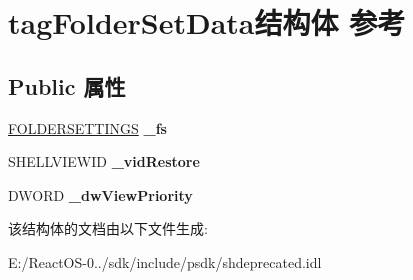 \hypertarget{structtag_folder_set_data}{}\section{tag\+Folder\+Set\+Data结构体 参考}
\label{structtag_folder_set_data}
\subsection*{Public 属性}
\begin{DoxyCompactItemize}
\item 
\mbox{\label{structtag_folder_set_data_a46dbc18628160badaa4b10a3410b9991}} 
\hyperlink{struct_f_o_l_d_e_r_s_e_t_t_i_n_g_s}{F\+O\+L\+D\+E\+R\+S\+E\+T\+T\+I\+N\+GS} {\bfseries \+\_\+fs}
\item 
\mbox{\label{structtag_folder_set_data_a32a71ecb055dd6701be303ba2a637d75}} 
S\+H\+E\+L\+L\+V\+I\+E\+W\+ID {\bfseries \+\_\+vid\+Restore}
\item 
\mbox{\label{structtag_folder_set_data_ad52b46d5c1b82e7120fce8ed0dea4ae1}} 
D\+W\+O\+RD {\bfseries \+\_\+dw\+View\+Priority}
\end{DoxyCompactItemize}


该结构体的文档由以下文件生成\+:\begin{DoxyCompactItemize}
\item 
E\+:/\+React\+O\+S-\/0../sdk/include/psdk/shdeprecated.\+idl\end{DoxyCompactItemize}
